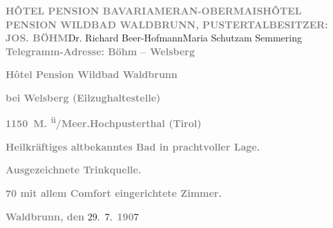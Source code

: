 \toendnotes[C]{\smallbreak}\pstart{}{\pb}\textcolor{gray}{\textbf{HÔTEL {\kaufmannsund}
                           PENSION BAVARIAMERAN-OBERMAIS}}\pend{}\pstart{}\textcolor{gray}{\textbf{HÔTEL {\kaufmannsund} PENSION WILDBAD WALDBRUNN, PUSTERTAL}}\pend{}\pstart{}\textcolor{gray}{\textbf{BESITZER: JOS. BÖHM}}\pend{}{\bigskip}\pstart{}Dr. Richard Beer-Hofmann\pend{}\pstart{}Maria Schutz\pend{}\pstart{}am Semmering\pend{}{\bigskip}\vspace{1em}
\pstart
           {\pb}\textcolor{gray}{\textbf{Telegramm-Adresse: Böhm – Welsberg}}\pend
           
\pstart
           \textcolor{gray}{\textbf{Hôtel {\kaufmannsund} Pension Wildbad Waldbrunn}}\pend
           
\pstart
           \textcolor{gray}{\textbf{bei Welsberg
                     (Eilzughaltestelle)}}\pend
           
\pstart
           \textcolor{gray}{\textbf{1150 M. \textsuperscript{ü}/Meer.\hspace*{1.5em}Hochpusterthal (Tirol)}}\pend
           
\pstart
           \textcolor{gray}{\textbf{Heilkräftiges altbekanntes Bad in prachtvoller Lage.}}\pend
           
\pstart
           \textcolor{gray}{\textbf{Ausgezeichnete Trinkquelle.}}\pend
           
\pstart
           \textcolor{gray}{\textbf{70 mit allem Comfort eingerichtete Zimmer.}}\pend
           
\pstart
           \raggedleft{}\textcolor{gray}{\textbf{Waldbrunn, den}}{ }29. 7. \textcolor{gray}{\textbf{190}}7\pend
           
